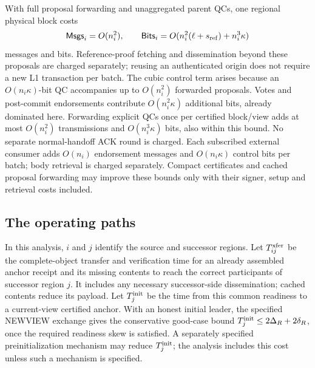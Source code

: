\documentclass[11pt,a4paper,onecolumn]{article}
\begin{document}
With full proposal forwarding and unaggregated parent QCs, one regional
physical block costs
\[
 \mathsf{Msgs}_i=O(n_i^2),\qquad
 \mathsf{Bits}_i=O(n_i^2(\ell+s_{\rm ref})+n_i^3\kappa)
\]
messages and bits. Reference-proof fetching and dissemination beyond
these proposals are charged separately; reusing an authenticated origin
does not require a new L1 transaction per batch. The cubic control term arises because an
$O(n_i\kappa)$-bit QC accompanies up to $O(n_i^2)$ forwarded proposals.
Votes and post-commit endorsements contribute $O(n_i^2\kappa)$ additional
bits, already dominated here. Forwarding explicit QCs once per certified
block/view adds at most $O(n_i^2)$ transmissions and $O(n_i^3\kappa)$ bits,
also within this bound. No separate normal-handoff ACK round is charged. Each subscribed external consumer adds
$O(n_i)$ endorsement messages and $O(n_i\kappa)$ control bits per batch;
body retrieval is charged separately. Compact certificates and cached
proposal forwarding may improve these bounds only with their signer,
setup and retrieval costs included.

\subsection{The operating paths}
In this analysis, $i$ and $j$ identify the source and successor regions.
Let $T_{ij}^{\rm xfer}$ be the complete-object transfer and verification time for an
already assembled anchor receipt and its missing contents to reach the
correct participants of successor region $j$. It includes any necessary
successor-side dissemination; cached contents reduce its payload. Let
$T_j^{\rm init}$ be the time from this common readiness to a current-view certified
anchor. With an honest initial leader, the specified NEWVIEW exchange gives the
conservative good-case bound $T_j^{\rm init}\leq2\Delta_R+2\delta_R$, once the required readiness
skew is satisfied. A separately specified preinitialization mechanism may
reduce $T_j^{\rm init}$; the analysis includes this cost unless such a
mechanism is specified.
\end{document}
